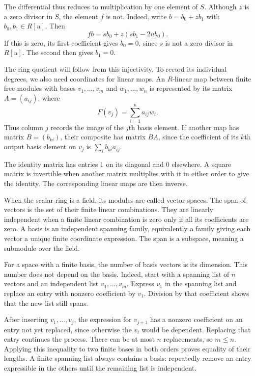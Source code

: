 The differential thus reduces to multiplication by one element of $S$.
Although $z$ is a zero divisor in $S$, the element $f$ is not.
Indeed, write $b=b_0+zb_1$ with $b_0,b_1\in R[u]$.
Then
\begin{equation}\label{eq:rel-injectivity}
 fb=s b_0+z(s b_1-2u b_0).
\end{equation}
If this is zero, its first coefficient gives $b_0=0$, since $s$ is not
a zero divisor in $R[u]$. The second then gives $b_1=0$.

The ring quotient will follow from this injectivity. To record its
individual degrees, we also need coordinates for linear maps.
An $R$-linear map between finite free modules with bases
$v_1,\ldots,v_m$ and $w_1,\ldots,w_n$ is represented by its matrix
$A=(a_{ij})$, where
\[
 F(v_j)=\sum_{i=1}^n a_{ij}w_i.
\]
Thus column $j$ records the image of the $j$th basis element.
If another map has matrix $B=(b_{ki})$, their composite has matrix
$BA$, since the coefficient of its $k$th output basis element on $v_j$
is $\sum_i b_{ki}a_{ij}$.

The identity matrix has entries $1$ on its diagonal and $0$ elsewhere.
A square matrix is invertible when another matrix multiplies with it
in either order to give the identity. The corresponding linear maps
are then inverse.

When the scalar ring is a field, its modules are called vector spaces.
The span of vectors is the set of their finite linear combinations.
They are linearly independent when a finite linear combination is zero
only if all its coefficients are zero.
A basis is an independent spanning family, equivalently a family giving
each vector a unique finite coordinate expression.
The span is a subspace, meaning a submodule over the field.

For a space with a finite basis, the number of basis vectors is its
dimension. This number does not depend on the basis.
Indeed, start with a spanning list of $n$ vectors and an independent list
$v_1,\ldots,v_m$. Express $v_1$ in the spanning list and replace an entry
with nonzero coefficient by $v_1$. Division by that coefficient shows
that the new list still spans.

After inserting $v_1,\ldots,v_j$, the expression for $v_{j+1}$ has a
nonzero coefficient on an entry not yet replaced, since otherwise the
$v_i$ would be dependent. Replacing that entry continues the process.
There can be at most $n$ replacements, so $m\leq n$.
Applying this inequality to two finite bases in both orders proves
equality of their lengths. A finite spanning list always contains a
basis: repeatedly remove an entry expressible in the others until the
remaining list is independent.

